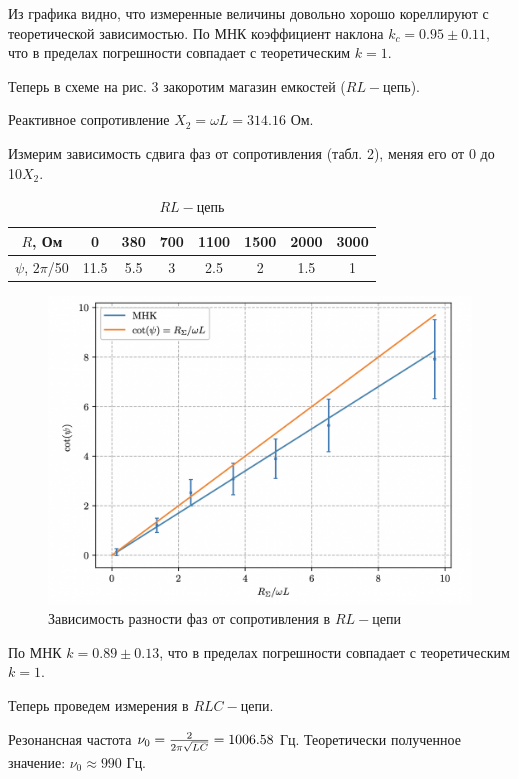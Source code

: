 \documentclass[12pt,a4paper]{article}
\begin{document}
Из графика видно, что измеренные величины довольно хорошо кореллируют с теоретической зависимостью.
По МНК коэффициент наклона $k_c = 0.95 \pm 0.11$, что в пределах погрешности совпадает с теоретическим $k = 1$.
\newpage

Теперь в схеме на рис. 3 закоротим магазин емкостей ($RL-$цепь).

Реактивное сопротивление $X_2 = \omega L = 314.16$ Ом.

Измерим зависимость сдвига фаз от сопротивления (табл. 2), меняя его от 0 до 10$X_2$.


\begin{table}[H]
    \centering
    \begin{tabular}{|c|c|c|c|c|c|c|c|}
        \hline
        $R$, Ом &0&380&700&1100&1500&2000&3000\\
        \hline
        $\psi$, $2\pi$/50 &11.5&5.5&3&2.5&2&1.5&1\\
        \hline
    \end{tabular}
    \caption{$RL - $цепь}
\end{table}

\begin{figure}[H]
    \centering
    \includegraphics[width=0.6\linewidth]{2.png}
    \caption{Зависимость разности фаз от сопротивления в $RL-$цепи}
\end{figure}

По МНК $k = 0.89 \pm 0.13$, что в пределах погрешности совпадает с теоретическим $k = 1$.
\newline

Теперь проведем измерения в $RLC-$цепи.

Резонансная частота $\nu_0 = {2\over 2\pi \sqrt{LC}} = 1006.58$ Гц.
Теоретически полученное значение: $\nu_0 \approx 990$ Гц.
\end{document}

